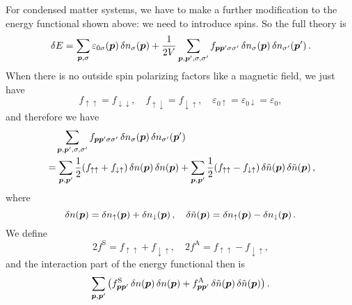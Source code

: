 \documentclass[hyperref, a4paper]{article}
\begin{document}
For condensed matter systems, 
we have to make a further modification to the energy functional shown above: 
we need to introduce spins. 
So the full theory is 
\begin{equation}
    \var{E} = \sum_{\vb*{p}, \sigma} \varepsilon_{0 \sigma} (\vb*{p}) \var{n_\sigma(\vb*{p})}
    + \frac{1}{2V} \sum_{\vb*{p}, \vb*{p}', \sigma, \sigma'}
    f_{\vb*{p} \vb*{p}' \sigma \sigma'} \var{n_{\sigma}(\vb*{p})} \var{n_{\sigma'} (\vb*{p}')}.
\end{equation}
When there is no outside spin polarizing factors 
like a magnetic field, 
we just have 
\begin{equation}
    f_{\uparrow \uparrow} = f_{\downarrow \downarrow}, \quad 
    f_{\uparrow \downarrow} = f_{\downarrow \uparrow}, \quad 
    \varepsilon_{0 \uparrow} = \varepsilon_{0 \downarrow} = \varepsilon_0,
\end{equation}
and therefore we have 
\[
    \begin{aligned}
        &\quad \sum_{\vb*{p}, \vb*{p}', \sigma, \sigma'} 
        f_{\vb*{p} \vb*{p}' \sigma \sigma'} \var{n_{\sigma}(\vb*{p})} \var{n_{\sigma'} (\vb*{p}')} \\
        &= \sum_{\vb*{p}, \vb*{p}'} \frac{1}{2} (f_{\uparrow \uparrow} + f_{\downarrow \uparrow})
        \var{n(\vb*{p})} \var{{n}(\vb*{p})}
        + \sum_{\vb*{p}, \vb*{p}'} \frac{1}{2} (f_{\uparrow \uparrow} - f_{\downarrow \uparrow})
        \var{\tilde{n}(\vb*{p})} \var{\tilde{n}(\vb*{p})},
    \end{aligned}
\]
where 
\begin{equation}
    \var{n(\vb*{p})} = \var{n_\uparrow(\vb*{p})} + \var{n_\downarrow(\vb*{p})}, \quad 
    \var{\tilde{n}(\vb*{p})} = \var{n_\uparrow(\vb*{p})} - \var{n_\downarrow(\vb*{p})}.
\end{equation}
We define 
\begin{equation}
    2f^{\text{S}} = f_{\uparrow \uparrow} + f_{\downarrow \uparrow}, \quad 
    2f^{\text{A}} = f_{\uparrow \uparrow} - f_{\downarrow \uparrow}, 
\end{equation}
and the interaction part of the energy functional then is 
\begin{equation}
    \sum_{\vb*{p}, \vb*{p}'} \left(
        f^{\text{S}}_{\vb*{p} \vb*{p}'} \var{n(\vb*{p})} \var{{n}(\vb*{p})}
    + f^{\text{A}}_{\vb*{p} \vb*{p}'} \var{\tilde{n}(\vb*{p})} \var{\tilde{n}(\vb*{p})}
    \right).
\end{equation}
\end{document}
